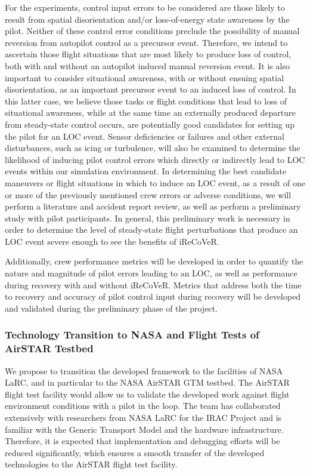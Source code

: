 \documentclass[letter,onecolumn,12pt]{aiaa-tc}
\begin{document}
For the experiments, control input errors to be considered are those likely to result from spatial disorientation and/or loss-of-energy state awareness by the pilot. Neither of these control error conditions preclude the possibility of manual reversion from autopilot control as a precursor event. Therefore, we intend to ascertain those flight situations that are most likely to produce loss of control, both with and without an autopilot induced manual reversion event. It is also important to consider situational awareness, with or without ensuing spatial disorientation, as an important precursor event to an induced loss of control. In this latter case, we believe those tasks or flight conditions that lead to loss of situational awareness, while at the same time an externally produced departure from steady-state control occurs, are potentially good candidates for setting up the pilot for an LOC event. Sensor deficiencies or failures and other external disturbances, such as icing or turbulence, will also be examined to determine the likelihood of inducing pilot control errors which directly or indirectly lead to LOC events within our simulation environment. In determining the best candidate maneuvers or flight situations in which to induce an LOC event, as a result of one or more of the previously mentioned crew errors or adverse conditions, we will perform a literature and accident report review, as well as perform a preliminary study with pilot participants. In general, this preliminary work is necessary in order to determine the level of steady-state flight perturbations that produce an LOC event severe enough to see the benefits of iReCoVeR.


Additionally, crew performance metrics will be developed in order to quantify the nature and magnitude of pilot errors leading to an LOC, as well as performance during recovery with and without iReCoVeR. Metrics that address both the time to recovery and accuracy of pilot control input during recovery will be developed and validated during the preliminary phase of the project.


\subsubsection{Technology Transition to NASA and Flight Tests of AirSTAR Testbed}

We propose to transition the developed framework to the facilities of NASA LaRC, and in particular to the NASA AirSTAR GTM testbed. The AirSTAR flight test facility would allow us to validate the developed work against flight environment conditions with a pilot in the loop. The team has collaborated extensively with researchers from NASA LaRC for the IRAC Project and is familiar with the Generic Transport Model and the hardware infrastructure. Therefore, it is expected that implementation and debugging efforts will be reduced significantly, which ensures a smooth transfer of the developed technologies to the AirSTAR flight test facility.
\end{document}
